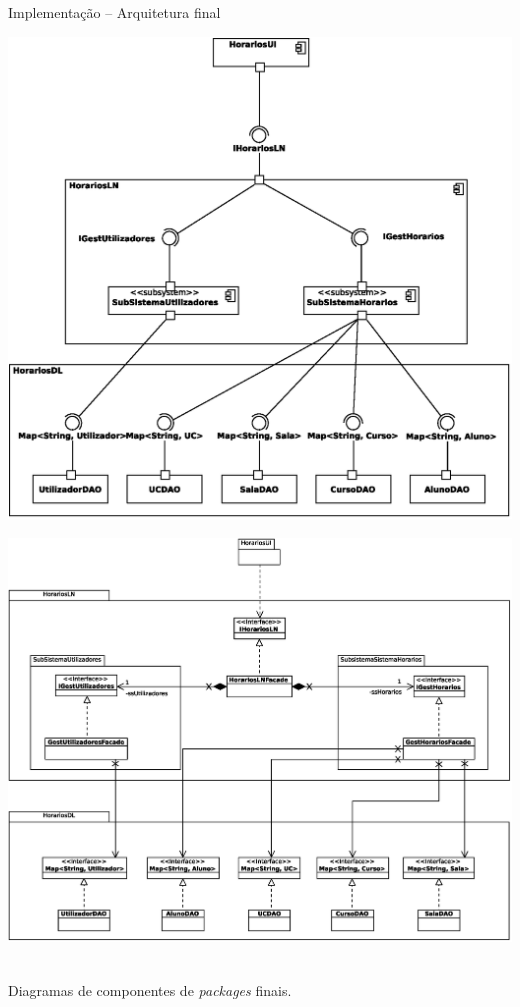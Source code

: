 \documentclass[13pt, handout]{beamer}
\begin{document}
\begin{frame}{Implementação -- Arquitetura final}
    \centering

    \begin{minipage}{0.45\textwidth}
        \includegraphics[width=\textwidth]{Imagens/Modelos/ComponentesDAO.svg.eps}
    \end{minipage}
    \hspace{0.5cm}
    \begin{minipage}{0.45\textwidth}
        \includegraphics[width=\textwidth]{Imagens/Modelos/GeralDAO.svg.eps}
    \end{minipage} \\
    \vspace{0.25cm}
    {\scriptsize Diagramas de componentes de \emph{packages} finais.}
\end{frame}
\end{document}
